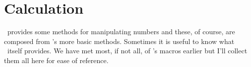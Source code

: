 


\makeatletter
\newcount\fib
\newcount\fibprev
\newcount\fibprevprev
\newcount\fibtogo

\newcommand*{\fibseries}[1]{%
  \fibprevprev=1\relax
  \fibprev=1\relax
  \ifnum #1>0\relax
    \@fibseries{#1}%
  \fi}

\newcommand*{\gfibseries}[3]{%
  \fibprevprev=#1\relax
  \fibprev=#2\relax
  \ifnum #3>0\relax
    \@fibseries{#3}%
  \fi}

\newcommand*{\@fibseries}[1]{%
  \fibtogo=#1\relax
  \ifnum \fibtogo=1\relax
    \the\fibprevprev
  \else
    \ifnum \fibtogo=2\relax
      \the\fibprevprev{} and \the\fibprev
    \else
      \advance\fibtogo by -2\relax
      \the\fibprevprev, \the\fibprev
      \loop
        \@fibnext
      \ifnum \fibtogo>0\relax
      \repeat
    \fi
  \fi}

\newcommand*{\@fibnext}{%
  \fib=\fibprev
  \advance\fib by \fibprevprev
  \fibprevprev=\fibprev
  \fibprev=\fib
  \printfibterm
  \advance\fibtogo by -1\relax}

\newcommand*{\printfibterm}{%
  \ifnum \fibtogo=1\relax
    \space and \else , \fi
  \the\fib}

\renewcommand*{\@fibseries}[1]{%
  \fibtogo=#1\relax
  \ifcase \fibtogo %
  \or  %
    \the\fibprevprev
  \or  %
    \the\fibprevprev{} and \the\fibprev
  \else %
    \advance\fibtogo by -\tw@
    \the\fibprevprev, \the\fibprev
    \@whilenum \fibtogo > 0\do {%
      \@fibnext}%
  \fi}

\makeatother


\section{Calculation}

    \ltx\ provides some methods for manipulating numbers and these, of course,
are composed from \tx's more basic methods. Sometimes it is
useful to know what \tx\ itself provides. We have met most, if not all,
of \ltx's macros earlier but I'll collect them all here for ease of reference.

